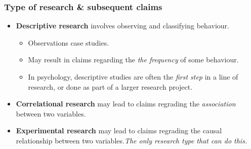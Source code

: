 \documentclass{article}
\begin{document}
 	\subsubsection{Type of research \& subsequent claims}
 	\begin{itemize}
 		\item \textbf{Descriptive research} involves observing and classifying behaviour.
 		\begin{itemize}
 			\item Observations case studies.
 			\item May result in claims regarding the \emph{the frequency} of some behaviour.
 			\item In psychology, descriptive studies are often the \emph{first step} in a line of research, or done as part of a larger research project.
 		\end{itemize}
 		\item \textbf{Correlational research} may lead to claims regrading the \emph{association} between two variables.
 		\item \textbf{Experimental research} may lead to claims regrading the causal relationship between two variables.\emph{The only research type that can do this.}
 	\end{itemize}
\end{document}
